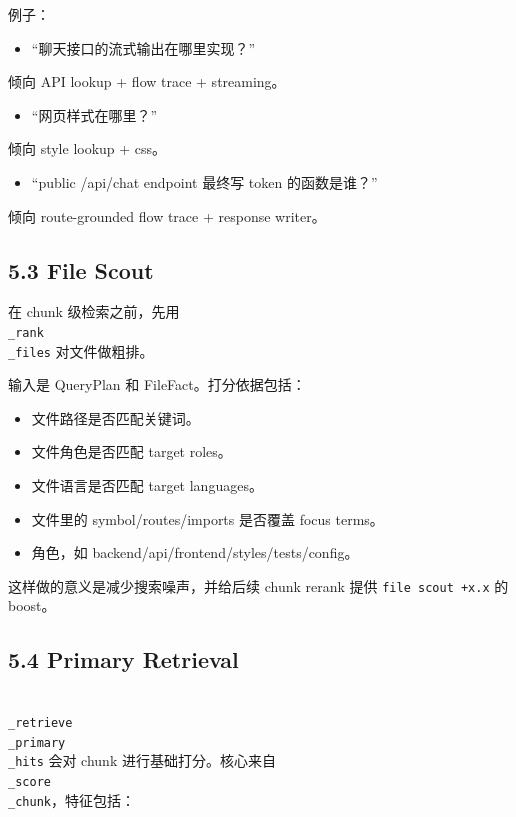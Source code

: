 \documentclass[UTF8,12pt,openany]{ctexbook}
\begin{document}
例子：\par

\begin{itemize}
\item “聊天接口的流式输出在哪里实现？”
\end{itemize}
  倾向 API lookup + flow trace + streaming。\par
\begin{itemize}
\item “网页样式在哪里？”
\end{itemize}
  倾向 style lookup + css。\par
\begin{itemize}
\item “public /api/chat endpoint 最终写 token 的函数是谁？”
\end{itemize}
  倾向 route-grounded flow trace + response writer。\par

\subsection{5.3 File Scout}

在 chunk 级检索之前，先用 \texttt{\\_rank\\_files} 对文件做粗排。\par

输入是 QueryPlan 和 FileFact。打分依据包括：\par

\begin{itemize}
\item 文件路径是否匹配关键词。
\item 文件角色是否匹配 target roles。
\item 文件语言是否匹配 target languages。
\item 文件里的 symbol/routes/imports 是否覆盖 focus terms。
\item 角色，如 backend/api/frontend/styles/tests/config。
\end{itemize}

这样做的意义是减少搜索噪声，并给后续 chunk rerank 提供 \texttt{file scout +x.x} 的 boost。\par

\subsection{5.4 Primary Retrieval}

\texttt{\\_retrieve\\_primary\\_hits} 会对 chunk 进行基础打分。核心来自 \texttt{\\_score\\_chunk}，特征包括：\par
\end{document}
